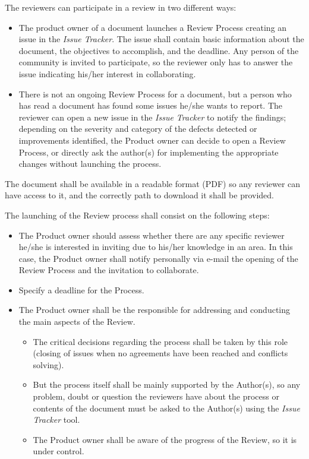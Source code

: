\documentclass{template/openetcs_article}
\begin{document}
The reviewers can participate in a review in two different ways:

\begin{itemize}
\item The product owner of a document launches a Review Process creating an issue in the {\it Issue Tracker}. The issue shall contain basic information about the document, the objectives to accomplish, and the deadline. Any person of the community is invited to participate, so the reviewer only has to answer the issue indicating his/her interest in collaborating.
\item There is not an ongoing Review Process for a document, but a person who has read a document has found some issues he/she wants to report. The reviewer can open a new issue in the {\it Issue Tracker} to notify the findings; depending on the severity and category of the defects detected or improvements identified, the Product owner can decide to open a Review Process, or directly ask the author(s) for implementing the appropriate changes without launching the process.
\end{itemize}

The document shall be available in a readable format (PDF) so any reviewer can have access to it, and the correctly path to download it shall be provided.

The launching of the Review process shall consist on the following steps:
\begin{itemize}
\item The Product owner should assess whether there are any specific reviewer he/she is interested in inviting due to his/her knowledge in an area. In this case, the Product owner shall notify personally via e-mail the opening of the Review Process and the invitation to collaborate.
\item Specify a deadline for the Process.
\item The Product owner shall be the responsible for addressing and conducting the main aspects of the Review. 
\begin{itemize}
\item The critical decisions regarding the process shall be taken by this role (closing of issues when no agreements have been reached and conflicts solving).
\item But the process itself shall be mainly supported by the Author(s), so any problem, doubt or question the reviewers have about the process or contents of the document must be asked to the Author(s) using the {\it Issue Tracker} tool. 
\item The Product owner shall be aware of the progress of the Review, so it is under control. 
\end{itemize}
\end{itemize}
\end{document}
